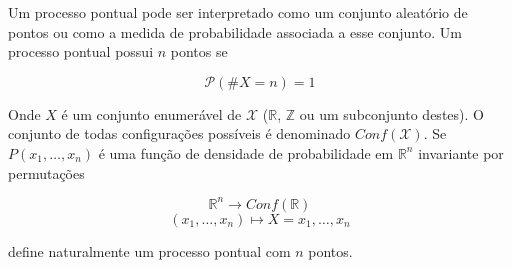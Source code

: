 Um processo pontual pode ser interpretado como um conjunto aleatório de pontos ou como a medida de probabilidade associada a esse conjunto. Um processo pontual possui $n$ pontos se

\[
\mathcal{P}(\# X=n) = 1
\]

Onde $X$ é um conjunto enumerável de $\mathcal{X}$ ($\mathbb{R}$, $\mathbb{Z}$ ou um subconjunto destes). O conjunto de todas configurações possíveis é denominado $Conf(\mathcal{X})$. Se $P(x_1, \dots, x_n)$ é uma função de densidade de probabilidade em $\mathbb{R}^n$ invariante por permutações

\[
	\mathbb{R}^n \rightarrow Conf(\mathbb{R})
\]
\[
	(x_1, \dots, x_n) \mapsto X = {x_1, \dots, x_n}
\]

define naturalmente um processo pontual com $n$ pontos.
